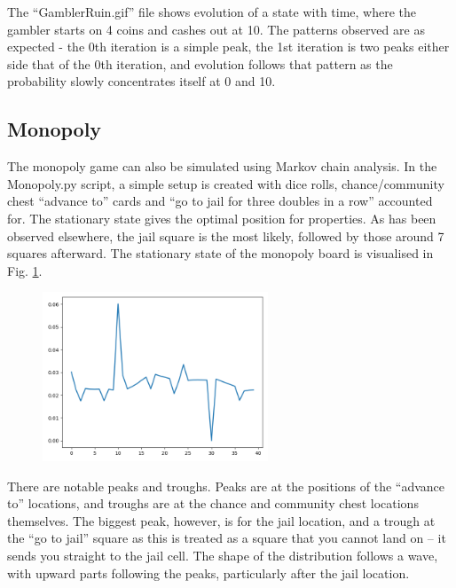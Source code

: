 \documentclass[12pt]{article}
\begin{document}
The ``GamblerRuin.gif'' file shows evolution of a state with time, where the gambler starts on 4 coins and cashes out at 10. 
The patterns observed are as expected - the 0th iteration is a simple peak, the 1st iteration is two peaks either side that of the 0th iteration, and evolution follows that pattern as the probability slowly concentrates itself at 0 and 10.

\subsection{Monopoly}

The monopoly game can also be simulated using Markov chain analysis. In the Monopoly.py script, a simple setup is created with dice rolls, chance/community chest ``advance to'' cards and ``go to jail for three doubles in a row'' accounted for. The stationary state gives the optimal position for properties. 
As has been observed elsewhere, the jail square is the most likely, followed by those around 7 squares afterward.
The stationary state of the monopoly board is visualised in Fig. \ref{fig:monopoly}.

\begin{figure}\label{fig:monopoly}
	\centering
	\includegraphics[width=0.6\textwidth]{MonopolyStationary.png}
\end{figure}

There are notable peaks and troughs. Peaks are at the positions of the ``advance to'' locations, and troughs are at the chance and community chest locations themselves. The biggest peak, however, is for the jail location, and a trough at the ``go to jail'' square as this is treated as a square that you cannot land on -- it sends you straight to the jail cell. The shape of the distribution follows a wave, with upward parts following the peaks, particularly after the jail location.
\end{document}
